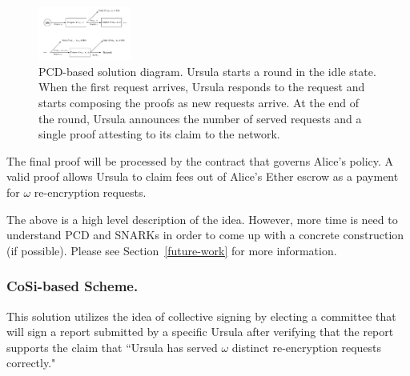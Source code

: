 \begin{figure}[h!]
\centerline{
\includegraphics[height= 0.7in, width = 1.0\columnwidth]{figures/pcd-based-sol.pdf}}
\caption{PCD-based solution diagram. Ursula starts a round in the idle state. When 
the first request arrives, Ursula responds to the request and starts composing the 
proofs as new requests arrive. At the end of the round, Ursula announces the number of 
served requests and a single proof attesting to its claim to the network. }
\label{pcd-based-sol}
\end{figure}


The final proof will be processed by the contract that governs Alice's policy. A valid proof 
allows Ursula to claim fees out of Alice's Ether escrow as a payment for $\omega$ re-encryption  
requests. 


The above is a high level description of the idea. However, more time is need to 
understand PCD and SNARKs in order to come up with a concrete construction 
(if possible). Please see Section~\ref{future-work} for more information.


\subsubsection{CoSi-based Scheme.}
This solution utilizes the idea of collective signing by electing a committee 
that will sign a report submitted by a specific Ursula after verifying that 
the report supports the claim that ``Ursula has served $\omega$ distinct 
re-encryption requests correctly." 


